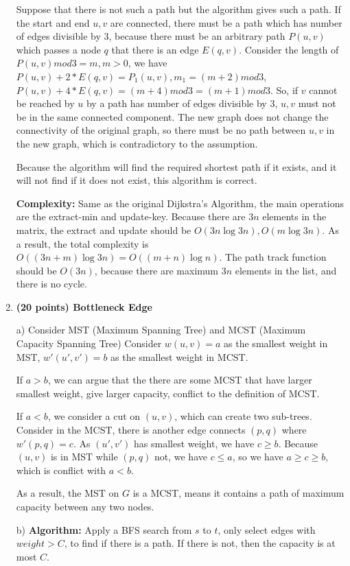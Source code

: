 \documentclass{article}
\begin{document}
\begin{enumerate}[topsep=0pt]
Suppose that there is not such a path but the algorithm gives such a path. 
If the start and end $u,v$ are connected, there must be a path which has number of edges divisible by 3, 
because there must be an arbitrary path $P(u,v)$ which passes a node $q$ that there is an edge $E(q,v)$.
Consider the length of $P(u,v) mod 3 = m, m > 0$, we have $P(u,v)+2*E(q,v)=P_1(u,v),m_1=(m + 2) mod 3$,
$P(u,v)+4*E(q,v)=(m + 4) mod 3 = (m + 1) mod 3$. So, if $v$ cannot be reached by $u$ by a path has number of edges divisible by 3,
$u,v$ must not be in the same connected component. The new graph does not change the connectivity of the original graph,
so there must be no path between $u,v$ in the new graph, which is contradictory to the assumption.

Because the algorithm will find the required shortest path if it exists, and it will not find if it does not exist, this algorithm is correct.

\textbf{Complexity:} Same as the original Dijkstra's Algorithm, the main operations are the extract-min and update-key.
Because there are $3n$ elements in the matrix, the extract and update should be $O(3n\log{3n}),O(m\log{3n})$.
As a result, the total complexity is $O((3n+m)\log{3n})=O((m+n)\log{n})$. The path track function should be $O(3n)$,
because there are maximum $3n$ elements in the list, and there is no cycle.

\item \textbf{(20 points) Bottleneck Edge} 

a) Consider MST (Maximum Spanning Tree) and MCST (Maximum Capacity Spanning Tree)
Consider $w(u,v)=a$ as the smallest weight in MST, $w'(u',v')=b$ as the smallest weight in MCST.

If $a>b$, we can argue that the there are some MCST that have larger smallest weight, give larger capacity,
conflict to the definition of MCST.

If $a<b$, we consider a cut on $(u,v)$, which can create two sub-trees. Consider in the MCST,
there is another edge connects $(p,q)$ where $w'(p,q)=c$. As $(u',v')$ has smallest weight,
we have $c\geq b$. Because $(u,v)$ is in MST while $(p,q)$ not, we have $c\leq a$, 
so we have $a\geq c\geq b$, which is conflict with $a<b$.

As a result, the MST on $G$ is a MCST, means it contains a path of maximum capacity between any two nodes.

b) \textbf{Algorithm:}
Apply a BFS search from $s$ to $t$, only select edges with $weight>C$, to find if there is a path.
If there is not, then the capacity is at most $C$.


\end{enumerate}
\end{document}
